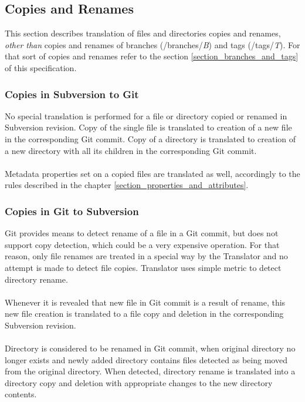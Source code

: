 \subsection{Copies and Renames}
This section describes translation of files and directories copies and renames, \emph{other than} copies and renames of 
branches (/branches/\emph{B}) and tags (/tags/\emph{T}). For that sort of copies and renames refer to the section \ref{section_branches_and_tags} of this specification.

\subsubsection{Copies in Subversion to Git}
No special translation is performed for a file or directory copied or renamed in Subversion revision. Copy of the single file is translated 
to creation of a new file in the corresponding Git commit. Copy of a directory is translated to creation of a new directory with all its children
in the corresponding Git commit.
\\\\ 
Metadata properties set on a copied files are translated as well, accordingly to the rules described in the chapter \ref{section_properties_and_attributes}.

\subsubsection{Copies in Git to Subversion}
Git provides means to detect rename of a file in a Git commit, but does not support copy detection, which could be 
a very expensive operation. For that reason, only file renames are treated in a special way by the Translator and
no attempt is made to detect file copies. Translator uses simple metric to detect directory rename.\\\\
Whenever it is revealed that new file in Git commit is a result of rename, this new file creation is translated to a file copy and deletion in the 
corresponding Subversion revision.\\\\ 
Directory is considered to be renamed in Git commit, when original directory no longer exists and newly added directory contains
files detected as being moved from the original directory. When detected, directory rename is translated into a directory copy
and deletion with appropriate changes to the new directory contents.
